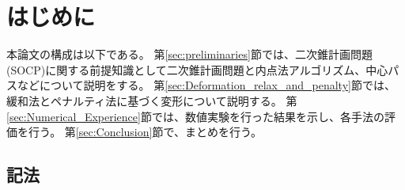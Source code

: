 \documentclass[11pt,a4paper,dvipdfmx,titlepage,uplatex]{jsarticle}
\title{{\large 令和4年度　学士論文}\\ \vskip\baselineskip
taitoru\\タイトル}
\author{東京工業大学　情報理工学院　数理・計算科学系\\
学籍番号　19B31048\\
脇田康平\\
指導教員 山下 真 教授\\
}
\date{2022年2月27日}
\theoremstyle{mystyle}
\newcommand{\0}{\mathbf{0}}
\begin{document}
\maketitle

\tableofcontents
\clearpage

\section{はじめに}\label{sec:introduction}

本論文の構成は以下である。
第\ref{sec:preliminaries}節では、二次錐計画問題(SOCP)に関する前提知識として二次錐計画問題と内点法アルゴリズム、中心パスなどについて説明をする。
第\ref{sec:Deformation_relax_and_penalty}節では、緩和法とペナルティ法に基づく変形について説明する。
第\ref{sec:Numerical_Experience}節では、数値実験を行った結果を示し、各手法の評価を行う。
第\ref{sec:Conclusion}節で、まとめを行う。

\subsection{記法}\label{sec:notation}
\end{document}
